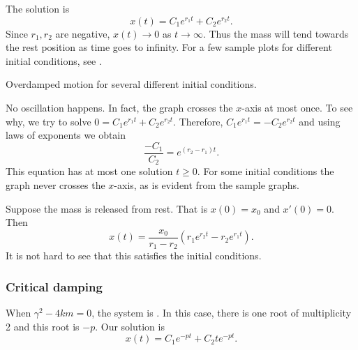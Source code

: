 \documentclass{ximera}
\begin{document}
The solution is
\begin{equation*}
    x(t) = C_1 e^{r_1 t} + C_2 e^{r_2 t} .
\end{equation*}
Since $r_1, r_2$ are negative, $x(t) \to 0$ as $t \to \infty$. Thus the mass will tend towards the rest position as time goes to infinity.  For a few sample plots for different initial conditions, see .

\begin{mywrapfig}[17]{3.25in}
    \capstart
    \caption{Overdamped motion for several different initial conditions.\label{mv:overdampedfig}}
\end{mywrapfig}
%
%


No oscillation happens.  In fact, the graph crosses the $x$-axis at most once.  To see why, we try to solve $0 = C_1 e^{r_1 t} + C_2 e^{r_2 t}$. Therefore, $C_1 e^{r_1 t} = - C_2 e^{r_2 t}$ and using laws of exponents we obtain
\begin{equation*}
    \frac{-C_1}{C_2} = e^{(r_2-r_1) t} .
\end{equation*}
This equation has at most one solution $t \geq 0$. For some initial conditions the graph never crosses the $x$-axis, as is evident from the sample graphs.

\begin{example}
    Suppose the mass is released from rest.  That is $x(0) = x_0$ and $x'(0) = 0$. Then
    \begin{equation*}
        x(t) = \frac{x_0}{r_1-r_2} \left(r_1 e^{r_2 t} - r_2 e^{r_1 t} \right) .
    \end{equation*}
    It is not hard to see that this satisfies the initial conditions.
\end{example}

\subsubsection{Critical damping}

When $\gamma^2 - 4km = 0$, the system is \emph{}.  In this case, there is one root of multiplicity 2 and this root is $-p$.  Our solution is
\begin{equation*}
    x(t) = C_1 e^{-pt} + C_2 t e^{-pt} .
\end{equation*}
\end{document}
